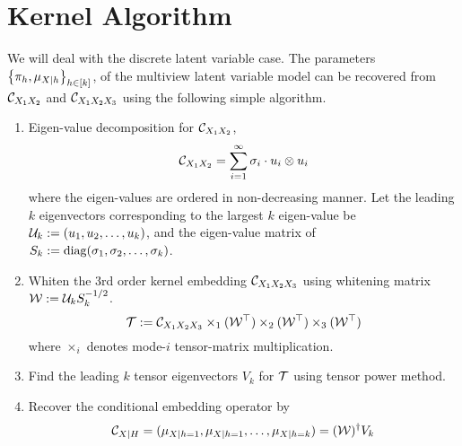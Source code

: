 \documentclass[11pt]{article}
\begin{document}


\section{Kernel Algorithm}

We will deal with the discrete latent variable case. 
The parameters $\left\{\pi_h, \mu_{X|h}\right\}_{h \in [k]}$, of the multiview latent variable model can be recovered from $\mathcal{C}_{X_1 X_2}$ and $\mathcal{C}_{X_1 X_2 X_3}$ using the following simple algorithm.
\begin{enumerate}
  \item Eigen-value decomposition for $\mathcal{C}_{X_1 X_2}$,
    $$\mathcal{C}_{X_1 X_2} = \sum_{i=1}^{\infty} \sigma_i \cdot u_i \otimes u_i$$
    where the eigen-values are ordered in non-decreasing manner. Let the leading $k$ eigenvectors corresponding to the largest $k$ eigen-value be  $\mathcal{U}_k:=(u_1,u_2,\ldots,u_k)$, and the eigen-value matrix of $S_k:=\mathop{\mathrm{diag}}(\sigma_1,\sigma_2,\ldots,\sigma_k)$.
  \item Whiten the 3rd order kernel embedding $\mathcal{C}_{X_1 X_2 X_3}$ using whitening matrix $\mathcal{W}:= \mathcal{U}_k S_k^{-1/2}$.
    $${\mathcal{T}} := \mathcal{C}_{X_1 X_2 X_3} \times_1 (\mathcal{W}^\top) \times_2 (\mathcal{W}^\top) \times_3 (\mathcal{W}^\top)$$
    where $\times_i$ denotes mode-$i$ tensor-matrix multiplication.
  \item Find the leading $k$ tensor eigenvectors $V_k$ for ${\mathcal{T}}$ using tensor power method.
  \item Recover the conditional embedding operator by
    $$ \mathcal{C}_{X|H} = (\mu_{X|h=1},\mu_{X|h=1},\ldots,\mu_{X|h=k}) = (\mathcal{W})^\dagger V_k $$
\end{enumerate}
\end{document}
